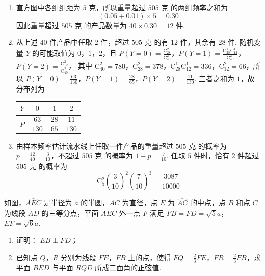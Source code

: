 \begin{solution}
\begin{enumerate}
\item 直方图中各组组距为 \(5\text{ 克}\)，所以重量超过 \(505\text{ 克}\) 的两组频率之和为
\[
(0.05+0.01)\times5=0.30
\]
因此重量超过 \(505\text{ 克}\) 的产品数量为 \(40\times0.30=12\text{ 件}\).
\item 从上述 \(40\) 件产品中任取 \(2\) 件，超过 \(505\text{ 克}\) 的有 \(12\) 件，其余有 \(28\) 件. 随机变量 \(Y\) 的可能取值为 \(0\)，\(1\)，\(2\)，且
\(P(Y=0)=\frac{\mathrm C_{28}^{2}}{\mathrm C_{40}^{2}}\)，\(P(Y=1)=\frac{\mathrm C_{28}^{1}\mathrm C_{12}^{1}}{\mathrm C_{40}^{2}}\)，\(P(Y=2)=\frac{\mathrm C_{12}^{2}}{\mathrm C_{40}^{2}}\)，
其中 \(\mathrm C_{40}^{2}=780\)，\(\mathrm C_{28}^{2}=378\)，\(\mathrm C_{28}^{1}\mathrm C_{12}^{1}=336\)，\(\mathrm C_{12}^{2}=66\)，所以
\(P(Y=0)=\frac{63}{130}\)，\(P(Y=1)=\frac{28}{65}\)，\(P(Y=2)=\frac{11}{130}\).
三者之和为 \(1\)，故分布列为

\begin{center}
\begin{tabular}{c|ccc}
\(Y\) & \(0\) & \(1\) & \(2\) \\
\hline
\(P\) & \(\dfrac{63}{130}\) & \(\dfrac{28}{65}\) & \(\dfrac{11}{130}\)
\end{tabular}
\end{center}
\item 由样本频率估计流水线上任取一件产品的重量超过 \(505\text{ 克}\) 的概率为 \(p=\frac{12}{40}=\frac3{10}\)，不超过 \(505\text{ 克}\) 的概率为 \(1-p=\frac7{10}\). 任取 \(5\) 件时，恰有 \(2\) 件超过 \(505\text{ 克}\) 的概率为
\[
\mathrm C_{5}^{2}\left(\frac3{10}\right)^2\left(\frac7{10}\right)^3=\frac{3087}{10000}
\]
\end{enumerate}
\end{solution}

\begin{problem}
如图，\(\widehat{AEC}\) 是半径为 \(a\) 的半圆，\(AC\) 为直径，点 \(E\) 为 \(\widehat{AC}\) 的中点，点 \(B\) 和点 \(C\) 为线段 \(AD\) 的三等分点，平面 \(AEC\) 外一点 \(F\) 满足 \(FB = FD = \sqrt{5}a\)，\(EF = \sqrt{6}a\).

\begin{enumerate}
\item 证明： \(EB \perp FD\)；
\item 已知点 \(Q\)，\(R\) 分别为线段 \(FE\)，\(FB\) 上的点，使得 \(FQ = \frac{2}{3} FE\)，\(FR = \frac{2}{3} FB\)，求平面 \(BED\) 与平面 \(RQD\) 所成二面角的正弦值.
\end{enumerate}

\end{problem}

